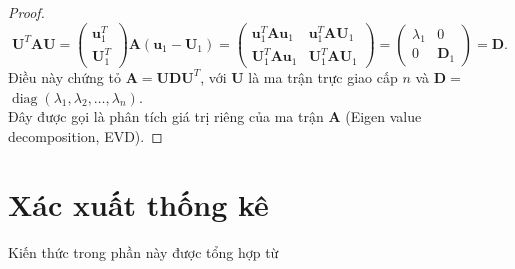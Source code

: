 \documentclass[12pt,a4paper,oneside]{report}
\numberwithin{equation}{section}
\begin{document}
\begin{proof}
	$$
	\mathbf{U}^{T} \mathbf{A} \mathbf{U}=\left(\begin{array}{c}
		\mathbf{u}_{1}^{T} \\
		\mathbf{U}_{1}^{T}
	\end{array}\right) \mathbf{A}\left(\mathbf{u}_{1}-\mathbf{U}_{1}\right)=\left(\begin{array}{cc}
		\mathbf{u}_{1}^{T} \mathbf{A} \mathbf{u}_{1} & \mathbf{u}_{1}^{T} \mathbf{A} \mathbf{U}_{1} \\
		\mathbf{U}_{1}^{T} \mathbf{A} \mathbf{u}_{1} & \mathbf{U}_{1}^{T} \mathbf{A} \mathbf{U}_{1}
	\end{array}\right)=\left(\begin{array}{cc}
		\lambda_{1} & 0 \\
		0 & \mathbf{D}_{1}
	\end{array}\right)=\mathbf{D} .
	$$
	Điều này chứng tỏ $\mathbf{A}=\mathbf{U D U}^{T}$, với $\mathbf{U}$ là ma trận trực giao cấp $n$ và $\mathbf{D}=$ $\operatorname{diag}\left(\lambda_{1}, \lambda_{2}, \ldots, \lambda_{n}\right).$\\
	Đây được gọi là phân tích giá trị riêng của ma trận $\mathbf{A}$ (Eigen value decomposition, EVD). 
\end{proof}
\section{Xác xuất thống kê}
Kiến thức trong phần này được tổng hợp từ \cite{tiep2018}
\end{document}
